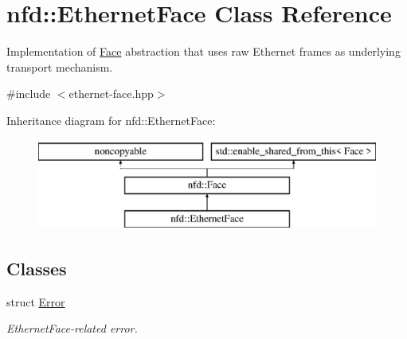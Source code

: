 \hypertarget{classnfd_1_1EthernetFace}{}\section{nfd\+:\+:Ethernet\+Face Class Reference}
\label{classnfd_1_1EthernetFace}


Implementation of \hyperlink{classnfd_1_1Face}{Face} abstraction that uses raw Ethernet frames as underlying transport mechanism.  




{\ttfamily \#include $<$ethernet-\/face.\+hpp$>$}

Inheritance diagram for nfd\+:\+:Ethernet\+Face\+:\begin{figure}[H]
\begin{center}
\leavevmode
\includegraphics[height=3.000000cm]{classnfd_1_1EthernetFace}
\end{center}
\end{figure}
\subsection*{Classes}
\begin{DoxyCompactItemize}
\item 
struct \hyperlink{structnfd_1_1EthernetFace_1_1Error}{Error}
\begin{DoxyCompactList}\small\item\em Ethernet\+Face-\/related error. \end{DoxyCompactList}\end{DoxyCompactItemize}
